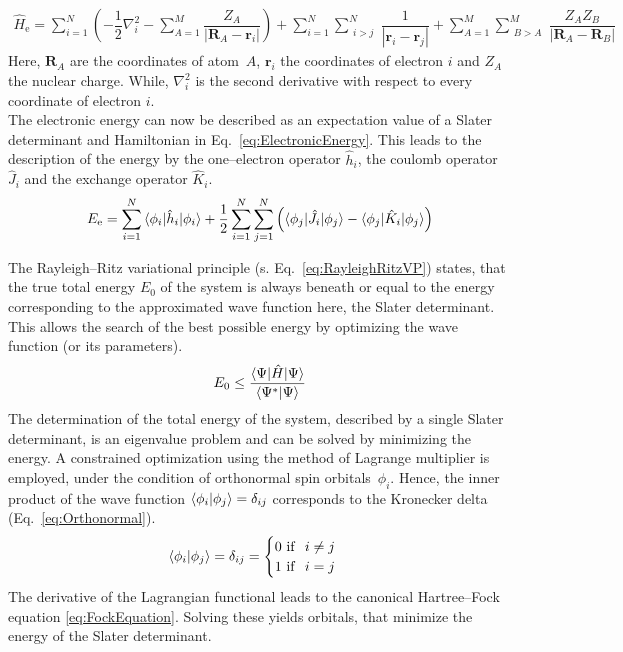 \begin{align}
	\label{eq:effHamiltonian}
	\hat{H}_\mathrm{e} =\sum_{i=1}^N \left( -\dfrac{1}{2}\nabla_i^2 -  \sum_{A = 1}^{M}  \dfrac{Z_A}{|\textbf{R}_A - \textbf{r}_i|}\right) 
	+ \sum_{i=1}^N \sum_{\substack{i>j}}^N \dfrac{1}{|\textbf{r}_{i} - \textbf{r}_{j}|} 
	+ \sum_{A=1}^M \sum_{\substack{B>A}}^M \dfrac{Z_A Z_B}{|\textbf{R}_A - \textbf{R}_B|}
\end{align}
Here, $\textbf{R}_A$ are the coordinates of atom~$A$, 
$\textbf{r}_i$ the coordinates of electron $i$ and $Z_A$ the nuclear charge.
While, $\nabla_i^2$ is the second derivative with respect to every coordinate of electron $i$.\\
The electronic energy can now be described as an expectation value of a Slater determinant and Hamiltonian in Eq.~\eqref{eq:ElectronicEnergy}.
This leads to the description of the energy by the one--electron operator $\hat{h}_i$,
the coulomb operator $\hat{J}_i$ and the exchange operator $\hat{K}_i$.
\begin{align}
	\label{eq:ElectronicEnergy}
	E_\mathrm{e} = \sum_{i=1}^N \braket{\phi_i | \hat{h}_i | \phi_i} 
	+ \dfrac{1}{2} \sum_{i=1}^N \sum_{j=1}^N \left(\braket{\phi_j | \hat{J}_i | \phi_j} 
	- \braket{\phi_j | \hat{K}_i | \phi_j}\right)
\end{align}

The Rayleigh--Ritz variational principle (s. Eq.~\eqref{eq:RayleighRitzVP}) states,
that the true total energy $E_0$ of the system is always beneath or equal
to the energy corresponding to the approximated wave function here, the Slater determinant.
This allows the search of the best possible energy by optimizing the wave function (or its parameters).
\begin{align}
	\label{eq:RayleighRitzVP}
	E_0 \leq \dfrac{\braket{\Psi | \hat{H} | \Psi}}{\braket{\Psi^* | \Psi}}
\end{align}
The determination of the total energy of the system, described by a single Slater determinant,
is an eigenvalue problem and can be solved by minimizing the energy. A constrained optimization using the method of Lagrange multiplier is employed,
under the condition of orthonormal spin orbitals~$\phi_i$.
Hence, the inner product of the wave function $\braket{\phi_i|\phi_j} = \delta_{ij}$ corresponds to the Kronecker delta (Eq.~\eqref{eq:Orthonormal}). 
\begin{align}
	\label{eq:Orthonormal}
	\braket{\phi_i|\phi_j} = \delta_{ij} =\begin{cases}
		0 ~\mathrm{if}~~i\neq j \\
		1 ~\mathrm{if}~~i=j \\
	\end{cases}
\end{align}
\newpage
The derivative of the Lagrangian functional leads to the canonical Hartree--Fock equation \eqref{eq:FockEquation}.
Solving these yields orbitals, that minimize the energy of the Slater determinant.

